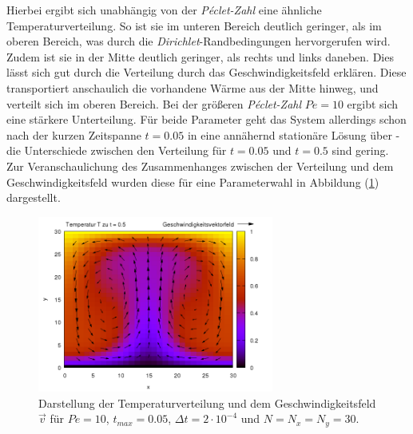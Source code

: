 \documentclass[12pt,a4paper,titlepage,headinclude,bibtotoc]{scrartcl}
\begin{document}
Hierbei ergibt sich unabhängig von der \textit{Péclet-Zahl} eine ähnliche Temperaturverteilung. So ist sie im unteren Bereich deutlich geringer, als im oberen Bereich, was durch die \textit{Dirichlet}-Randbedingungen hervorgerufen wird. Zudem ist sie in der Mitte deutlich geringer, als rechts und links daneben. Dies lässt sich gut durch die Verteilung durch das Geschwindigkeitsfeld erklären. Diese transportiert anschaulich die vorhandene Wärme aus der Mitte hinweg, und verteilt sich im oberen Bereich. Bei der größeren \textit{Péclet-Zahl} $Pe=10$ ergibt sich eine stärkere Unterteilung. Für beide Parameter geht das System allerdings schon nach der kurzen Zeitspanne $t = 0.05$ in eine annähernd stationäre Lösung über - die Unterschiede zwischen den Verteilung für $t=0.05$ und $t=0.5$ sind gering. Zur Veranschaulichung des Zusammenhanges zwischen der Verteilung und dem Geschwindigkeitsfeld wurden diese für eine Parameterwahl in Abbildung (\ref{fig:task4_velocity}) dargestellt.
\begin{figure}[H]
 \centering
   \includegraphics[width=0.69\textwidth]{res/task4/10_05_velocity.png}
   \caption{Darstellung der Temperaturverteilung und dem Geschwindigkeitsfeld $\vec{v}$ für $Pe = 10$, $t_{max} = 0.05$, $\Delta t = 2 \cdot 10^{-4}$ und $N=N_x=N_y = 30$.}
 \label{fig:task4_velocity}
\end{figure}
\end{document}
